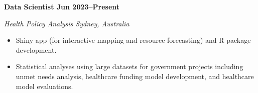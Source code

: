 \textbf{Data Scientist \hfill Jun 2023--Present}\par
\textit{Health Policy Analysis \hfill Sydney, Australia}\par
\begin{itemize}
	\item Shiny app (for interactive mapping and resource forecasting) and R package development.
	\item Statistical analyses using large datasets for government projects including unmet needs analysis, healthcare funding model development, and healthcare model evaluations.
\end{itemize}\par